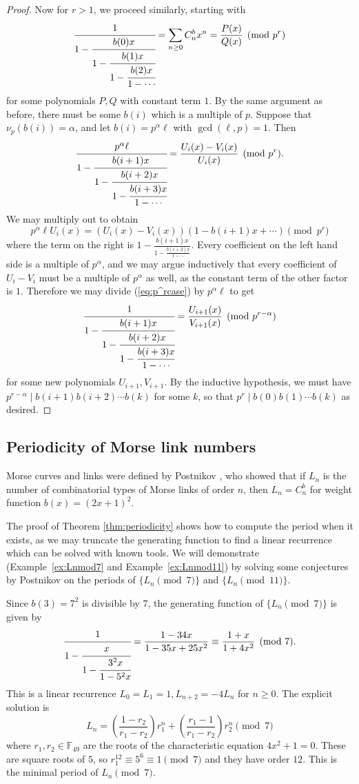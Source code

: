 \begin{proof}
    Now for $r > 1$, we proceed similarly, starting with 
    \[\cfrac{1}{1-\cfrac{b(0)x}{1-\cfrac{b(1)x}{1-\cfrac{b(2)x}{1-\cdots}}}}=\sum_{n\geq0}C_n^bx^n=\frac{P(x)}{Q(x)}\pmod{p^r}\]
    for some polynomials $P, Q$ with constant term $1$. By the same argument as before, there must be some $b(i)$ which is a multiple of $p$. Suppose that $\nu_p(b(i))=\alpha$, and let $b(i)=p^{\alpha}\ell$ with $\gcd(\ell, p)=1$. Then
     \begin{equation}
         \cfrac{p^{\alpha}\ell}{1-\cfrac{b(i+1)x}{1-\cfrac{b(i+2)x}{1-\cfrac{b(i+3)x}{1-\cdots}}}}=\frac{U_i(x)-V_i(x)}{U_i(x)}\pmod{p^r}\label{eq:p^rcase}.
     \end{equation}
     We may multiply out to obtain
     \[p^{\alpha}\ell U_i(x)=(U_i(x)-V_i(x))(1-b(i+1)x+\dotsb)\pmod{p^r}\]
     where the term on the right is $1-\frac{b(i+1)x}{1-\frac{b(i+2)x}{1-\cdots}}$. Every coefficient on the left hand side is a multiple of $p^{\alpha}$, and we may argue inductively that every coefficient of $U_i-V_i$ must be a multiple of $p^{\alpha}$ as well, as the constant term of the other factor is $1$. Therefore we may divide (\ref{eq:p^rcase}) by $p^{\alpha}\ell$ to get
     \[\cfrac{1}{1-\cfrac{b(i+1)x}{1-\cfrac{b(i+2)x}{1-\cfrac{b(i+3)x}{1-\cdots}}}}=\frac{U_{i+1}(x)}{V_{i+1}(x)}\pmod{p^{r-\alpha}}\]
     for some new polynomials $U_{i+1}, V_{i+1}$. By the inductive hypothesis, we must have $p^{r-\alpha}\mid b(i+1)b(i+2)\dotsm b(k)$ for some $k$, so that $p^r\mid b(0)b(1)\dotsm b(k)$ as desired.
\end{proof}

\subsection{Periodicity of Morse link numbers} \label{subsec:morseperiodicity}
Morse curves and links were defined by Postnikov \cite{postnikov2000morse}, who showed that if $L_n$ is the number of combinatorial types of Morse links of order $n$, then $L_n=C^b_n$ for weight function $b(x)=(2x+1)^2$.

The proof of Theorem \ref{thm:periodicity} shows how to compute the period when it exists, as we may truncate the generating function to find a linear recurrence which can be solved with known tools. We will demonstrate (Example~\ref{ex:Lnmod7} and Example~\ref{ex:Lnmod11}) by solving some conjectures by Postnikov on the periods of $\{L_n\pmod{7}\}$ and $\{L_n\pmod{11}\}$.
\begin{example}\label{ex:Lnmod7}
    Since $b(3)=7^2$ is divisible by $7$, the generating function of $\{L_n\pmod{7}\}$ is given by
    \[\cfrac{1}{1-\cfrac{x}{1-\cfrac{3^2x}{1-5^2x}}}=\frac{1-34x}{1-35x+25x^2}\equiv \frac{1+x}{1+4x^2}\pmod{7}.\]
    This is a linear recurrence $L_0=L_1=1, L_{n+2}=-4L_n$ for $n\geq 0$. The explicit solution is 
    \[L_n=\left(\frac{1-r_2}{r_1-r_2}\right)r_1^n+\left(\frac{r_1-1}{r_1-r_2}\right)r_2^n\pmod{7}\]
    where $r_1, r_2\in \mathbb{F}_{49}$ are the roots of the characteristic equation $4x^2+1=0$. These are square roots of $5$, so $r_1^{12}\equiv 5^6\equiv 1\pmod{7}$ and they have order $12$. This is the minimal period of $L_n\pmod{7}$.
\end{example}


